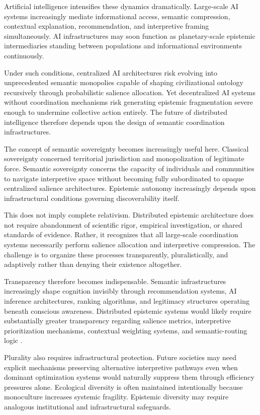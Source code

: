 \documentclass[11pt,a4paper]{article}
\begin{document}
Artificial intelligence intensifies these dynamics dramatically. Large-scale AI systems increasingly mediate informational access, semantic compression, contextual explanation, recommendation, and interpretive framing simultaneously. AI infrastructures may soon function as planetary-scale epistemic intermediaries standing between populations and informational environments continuously.

Under such conditions, centralized AI architectures risk evolving into unprecedented semantic monopolies capable of shaping civilizational ontology recursively through probabilistic salience allocation. Yet decentralized AI systems without coordination mechanisms risk generating epistemic fragmentation severe enough to undermine collective action entirely. The future of distributed intelligence therefore depends upon the design of semantic coordination infrastructures.

The concept of semantic sovereignty becomes increasingly useful here. Classical sovereignty concerned territorial jurisdiction and monopolization of legitimate force. Semantic sovereignty concerns the capacity of individuals and communities to navigate interpretive space without becoming fully subordinated to opaque centralized salience architectures. Epistemic autonomy increasingly depends upon infrastructural conditions governing discoverability itself.

This does not imply complete relativism. Distributed epistemic architecture does not require abandonment of scientific rigor, empirical investigation, or shared standards of evidence. Rather, it recognizes that all large-scale coordination systems necessarily perform salience allocation and interpretive compression. The challenge is to organize these processes transparently, pluralistically, and adaptively rather than denying their existence altogether.

Transparency therefore becomes indispensable. Semantic infrastructures increasingly shape cognition invisibly through recommendation systems, AI inference architectures, ranking algorithms, and legitimacy structures operating beneath conscious awareness. Distributed epistemic systems would likely require substantially greater transparency regarding salience metrics, interpretive prioritization mechanisms, contextual weighting systems, and semantic-routing logic \cite{pasquale2015}.

Plurality also requires infrastructural protection. Future societies may need explicit mechanisms preserving alternative interpretive pathways even when dominant optimization systems would naturally suppress them through efficiency pressures alone. Ecological diversity is often maintained intentionally because monoculture increases systemic fragility. Epistemic diversity may require analogous institutional and infrastructural safeguards.
\end{document}
